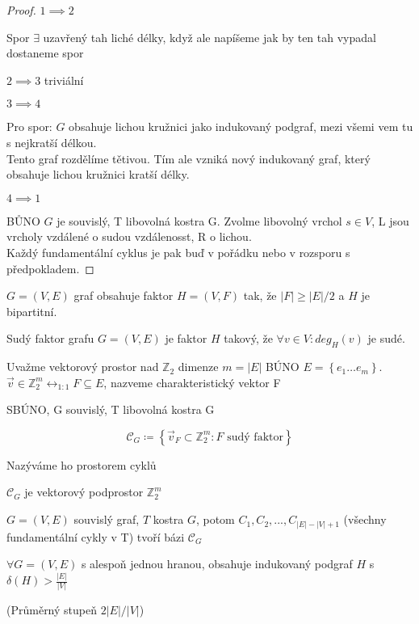\documentclass[../main.tex]{subfiles}
\begin{document}
\begin{proof}
    $1\implies 2 $

    Spor $\exists$ uzavřený tah liché délky, když ale napíšeme jak by ten tah vypadal dostaneme spor 

    $2\implies 3$ triviální

    $3\implies 4$ 
    
    Pro spor: $G$ obsahuje lichou kružnici jako indukovaný podgraf, mezi všemi vem tu s nejkratší délkou.\\
    Tento graf rozdělíme tětivou. Tím ale vzniká nový indukovaný graf, který obsahuje lichou kružnici kratší délky.

    $4\implies 1$
    
    BŮNO $G$ je souvislý, T libovolná kostra G. Zvolme libovolný vrchol $s\in V$, L jsou vrcholy vzdálené o sudou vzdálenosst, R o lichou.\\
    Každý fundamentální cyklus je pak buď v pořádku nebo v rozsporu s předpokladem.
\end{proof}

\begin{theorem}
    $G=(V,E)$ graf obsahuje faktor $H=(V,F)$ tak, že $|F|\geq |E|/2$ a $H$ je bipartitní.
\end{theorem}

\begin{definition}
    Sudý faktor grafu $G=(V,E)$ je faktor $H$ takový, že $\forall v\in V: deg_H(v)$ je sudé. 
\end{definition}

\begin{definition}
Uvažme vektorový prostor nad $\mathbb{Z}_2$ dimenze $m=|E|$ BÚNO $E = \left\{e_1\dots e_m\right\}$.\\
$\vec{v} \in \mathbb{Z}_2^m \leftrightarrow_{1:1} F\subseteq E $, nazveme charakteristický vektor F

SBÚNO, G souvislý, T libovolná kostra G

\begin{equation*}
    \mathcal{C}_G \coloneq \left\{  \vec{v}_F \subset \mathbb{Z}_2^m: F\text{ sudý faktor}  \right\}
\end{equation*}

Nazýváme ho prostorem cyklů
\end{definition}


\begin{claim}
    $ \mathcal{C}_G$ je vektorový podprostor $\mathbb{Z}_2^m$
\end{claim}


\begin{theorem}
    $G=(V,E)$ souvislý graf, $T$ kostra $G$, potom $C_1, C_2, ..., C_{|E|-|V|+1}$ (všechny fundamentální cykly v T) tvoří bázi $ \mathcal{C}_G$
\end{theorem}

\begin{theorem}
    $\forall G = (V,E)$ s alespoň jednou hranou, obsahuje indukovaný podgraf $H$ s $\delta(H) > \frac{|E|}{|V|}$
\end{theorem}

(Průměrný stupeň $2|E|/|V|$)
\end{document}
